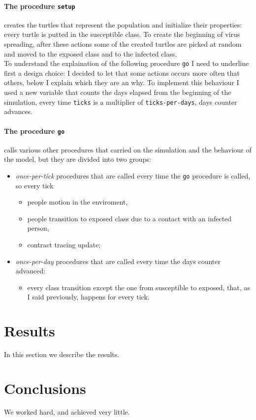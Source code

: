 \documentclass[12pt]{llncs}
\begin{document}
\paragraph{The procedure \texttt{setup}} creates the turtles that represent the population and initialize their properties: every turtle is putted in the susceptible class. To create the beginning of virus spreading, after these actions some of the created turtles are picked at random and moved to the exposed class and to the infected class.\\

To understand the explaination of the following procedure \texttt{go} I need to underline first a design choice: I decided to let that some actions occurs more often that others, below I explain which they are an why. To implement this behaviour I used a new variable that counts the days elapsed from the beginning of the simulation, every time \texttt{ticks} is a multiplier of \texttt{ticks-per-days}, days counter advances.\\

\paragraph{The procedure \texttt{go}} calls various other procedures that carried on the simulation and the behaviour of the model, but they are divided into two groups:
\begin{itemize}
\item \textit{once-per-tick} procedures that are called every time the \texttt{go} procedure is called, so every tick
\begin{itemize}
\item people motion in the enviroment, 
\item people transition to exposed class due to a contact with an infected person,
\item contract tracing update;
\end{itemize}
\item \textit{once-per-day} procedures that are called every time the days counter advanced:
\begin{itemize}
\item every class transition except the one from susceptible to exposed, that, as I said previously, happens for every tick.
\end{itemize}
\end{itemize}




\section{Results}\label{results}
In this section we describe the results.

\section{Conclusions}\label{conclusions}
We worked hard, and achieved very little.

\printbibliography[title={References}]
\end{document}
